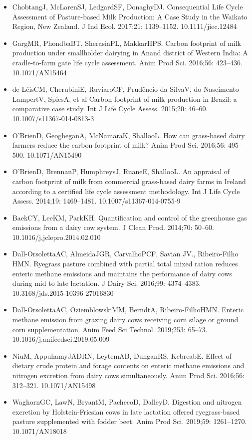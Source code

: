 \documentclass[11pt,a4paper]{article}
\begin{document}
\begin{itemize}
\item ChobtangJ, McLarenSJ, LedgardSF, DonaghyDJ. Consequential Life Cycle Assessment of Pasture-based Milk Production: A Case Study in the Waikato Region, New Zealand. J Ind Ecol. 2017;21: 1139–1152. 10.1111/jiec.12484
\item GargMR, PhondbaBT, SherasiaPL, MakkarHPS. Carbon footprint of milk production under smallholder dairying in Anand district of Western India: A cradle-to-farm gate life cycle assessment. Anim Prod Sci. 2016;56: 423–436. 10.1071/AN15464
\item de LéisCM, CherubiniE, RuviaroCF, Prudêncio da SilvaV, do Nascimento LampertV, SpiesA, et al Carbon footprint of milk production in Brazil: a comparative case study. Int J Life Cycle Assess. 2015;20: 46–60. 10.1007/s11367-014-0813-3
\item O’BrienD, GeogheganA, McNamaraK, ShallooL. How can grass-based dairy farmers reduce the carbon footprint of milk? Anim Prod Sci. 2016;56: 495–500. 10.1071/AN15490
\item O’BrienD, BrennanP, HumphreysJ, RuaneE, ShallooL. An appraisal of carbon footprint of milk from commercial grass-based dairy farms in Ireland according to a certified life cycle assessment methodology. Int J Life Cycle Assess. 2014;19: 1469–1481. 10.1007/s11367-014-0755-9
\item BaekCY, LeeKM, ParkKH. Quantification and control of the greenhouse gas emissions from a dairy cow system. J Clean Prod. 2014;70: 50–60. 10.1016/j.jclepro.2014.02.010
\item Dall-OrsolettaAC, AlmeidaJGR, CarvalhoPCF, Savian JV., Ribeiro-Filho HMN. Ryegrass pasture combined with partial total mixed ration reduces enteric methane emissions and maintains the performance of dairy cows during mid to late lactation. J Dairy Sci. 2016;99: 4374–4383. 10.3168/jds.2015-10396 27016830
\item Dall-OrsolettaAC, OziemblowskiMM, BerndtA, Ribeiro-FilhoHMN. Enteric methane emission from grazing dairy cows receiving corn silage or ground corn supplementation. Anim Feed Sci Technol. 2019;253: 65–73. 10.1016/j.anifeedsci.2019.05.009
\item NiuM, AppuhamyJADRN, LeytemAB, DunganRS, KebreabE. Effect of dietary crude protein and forage contents on enteric methane emissions and nitrogen excretion from dairy cows simultaneously. Anim Prod Sci. 2016;56: 312–321. 10.1071/AN15498
\item WaghornGC, LawN, BryantM, PachecoD, DalleyD. Digestion and nitrogen excretion by Holstein-Friesian cows in late lactation offered ryegrass-based pasture supplemented with fodder beet. Anim Prod Sci. 2019;59: 1261–1270. 10.1071/AN18018

\end{itemize}
\end{document}
